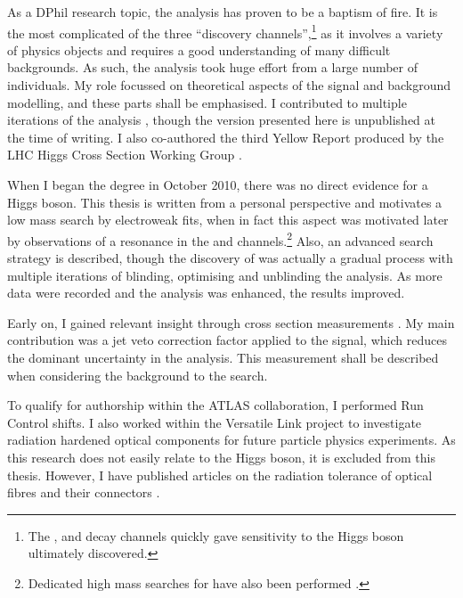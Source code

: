 
As a DPhil research topic, the \HWW analysis has proven to be a baptism of fire. It is the 
most complicated of the three ``discovery channels'',\footnote{
	The \HepProcess{\Pphoton\Pphoton}, \ZZ and \WW decay channels quickly gave sensitivity 
	to the Higgs boson ultimately discovered.
}
as it involves a variety of physics objects and requires a good understanding of many 
difficult backgrounds. As such, the analysis took huge effort from a large number of 
individuals. My role focussed on theoretical aspects of the signal and background 
modelling, and these parts shall be emphasised. I contributed to multiple iterations of 
the analysis \cite{ATLAS-discovery,HWW-HCP,HWW-Moriond}, though the version presented here 
is unpublished at the time of writing. I also co-authored the third Yellow Report 
produced by the LHC Higgs Cross Section Working Group \cite{YR3}.

When I began the degree in October 2010, there was no direct evidence for a Higgs boson. 
This thesis is written from a personal perspective and motivates a low mass search by 
electroweak fits, when in fact this aspect was motivated later by observations of a 
resonance in the \HepProcess{\Pphoton\Pphoton} and \ZZ channels.\footnote{
	Dedicated high mass searches for \HWW have also been performed \cite{HWW-highmass}.
}
Also, an advanced search strategy is described, though the discovery of \HWW was actually 
a gradual process with multiple iterations of blinding, optimising and unblinding the 
analysis. As more data were recorded and the analysis was enhanced, the results improved.

Early on, I gained relevant insight through \WW cross section measurements 
\cite{WW-1ifb,WW-HCP,WW-7TeV}. My main contribution was a jet veto correction factor 
applied to the \WW signal, which reduces the dominant uncertainty in the analysis. This 
measurement shall be described when considering the \WW background to the \HWW search.

To qualify for authorship within the ATLAS collaboration, I performed Run Control shifts. 
I also worked within the Versatile Link project \cite{VersatileLink} to investigate 
radiation hardened optical components for future particle physics experiments. As this 
research does not easily relate to the Higgs boson, it is excluded from this thesis. 
However, I have published articles on the radiation tolerance of optical fibres 
\cite{VersatileLinkFibres} and their connectors \cite{VersatileLinkConnectors}.
